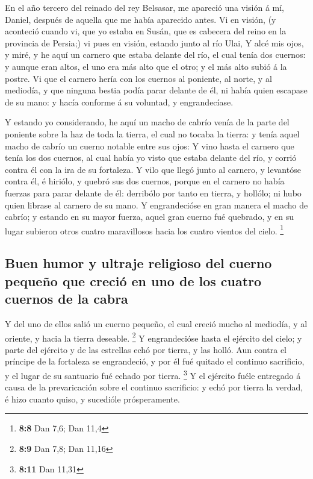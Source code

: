  En el año tercero del reinado del rey Belsasar, me
apareció una visión á mí, Daniel, después de aquella que me había
aparecido antes.  Vi en visión, (y aconteció cuando vi,
que yo estaba en Susán, que es cabecera del reino en la provincia de
Persia;) vi pues en visión, estando junto al río Ulai,  Y
alcé mis ojos, y miré, y he aquí un carnero que estaba delante del río,
el cual tenía dos cuernos: y aunque eran altos, el uno era más alto que
el otro; y el más alto subió á la postre.  Vi que el
carnero hería con los cuernos al poniente, al norte, y al mediodía, y
que ninguna bestia podía parar delante de él, ni había quien escapase de
su mano: y hacía conforme á su voluntad, y engrandecíase.

 Y estando yo considerando, he aquí un macho de cabrío
venía de la parte del poniente sobre la haz de toda la tierra, el cual
no tocaba la tierra: y tenía aquel macho de cabrío un cuerno notable
entre sus ojos:  Y vino hasta el carnero que tenía los dos
cuernos, al cual había yo visto que estaba delante del río, y corrió
contra él con la ira de su fortaleza.  Y vilo que llegó
junto al carnero, y levantóse contra él, é hiriólo, y quebró sus dos
cuernos, porque en el carnero no había fuerzas para parar delante de él:
derribólo por tanto en tierra, y hollólo; ni hubo quien librase al
carnero de su mano.  Y engrandecióse en gran manera el
macho de cabrío; y estando en su mayor fuerza, aquel gran cuerno fué
quebrado, y en su lugar subieron otros cuatro maravillosos hacia los
cuatro vientos del cielo. \footnote{\textbf{8:8} Dan 7,6; Dan 11,4}

\hypertarget{buen-humor-y-ultraje-religioso-del-cuerno-pequeuxf1o-que-creciuxf3-en-uno-de-los-cuatro-cuernos-de-la-cabra}{%
\subsection{Buen humor y ultraje religioso del cuerno pequeño que creció
en uno de los cuatro cuernos de la
cabra}\label{buen-humor-y-ultraje-religioso-del-cuerno-pequeuxf1o-que-creciuxf3-en-uno-de-los-cuatro-cuernos-de-la-cabra}}

 Y del uno de ellos salió un cuerno pequeño, el cual
creció mucho al mediodía, y al oriente, y hacia la tierra deseable.
\footnote{\textbf{8:9} Dan 7,8; Dan 11,16}  Y
engrandecióse hasta el ejército del cielo; y parte del ejército y de las
estrellas echó por tierra, y las holló.  Aun contra el
príncipe de la fortaleza se engrandeció, y por él fué quitado el
continuo sacrificio, y el lugar de su santuario fué echado por tierra.
\footnote{\textbf{8:11} Dan 11,31}  Y el ejército fuéle
entregado á causa de la prevaricación sobre el continuo sacrificio: y
echó por tierra la verdad, é hizo cuanto quiso, y sucedióle
prósperamente.

